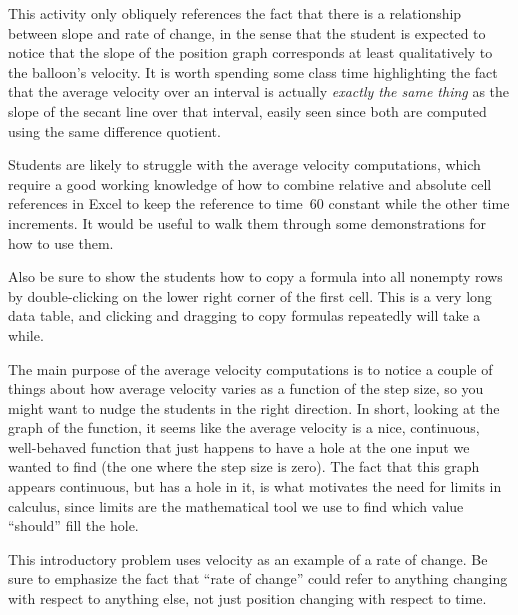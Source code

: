 This activity only obliquely references the fact that there is a relationship between slope and rate of change, in the sense that the student is expected to notice that the slope of the position graph corresponds at least qualitatively to the balloon's velocity. It is worth spending some class time highlighting the fact that the average velocity over an interval is actually \textit{exactly the same thing} as the slope of the secant line over that interval, easily seen since both are computed using the same difference quotient. %

Students are likely to struggle with the average velocity computations, which require a good working knowledge of how to combine relative and absolute cell references in Excel to keep the reference to time~60 constant while the other time increments. It would be useful to walk them through some demonstrations for how to use them.

Also be sure to show the students how to copy a formula into all nonempty rows by double-clicking on the lower right corner of the first cell. This is a very long data table, and clicking and dragging to copy formulas repeatedly will take a while.

The main purpose of the average velocity computations is to notice a couple of things about how average velocity varies as a function of the step size, so you might want to nudge the students in the right direction. In short, looking at the graph of the function, it seems like the average velocity is a nice, continuous, well-behaved function that just happens to have a hole at the one input we wanted to find (the one where the step size is zero). The fact that this graph appears continuous, but has a hole in it, is what motivates the need for limits in calculus, since limits are the mathematical tool we use to find which value ``should'' fill the hole.

This introductory problem uses velocity as an example of a rate of change. Be sure to emphasize the fact that ``rate of change'' could refer to anything changing with respect to anything else, not just position changing with respect to time.


